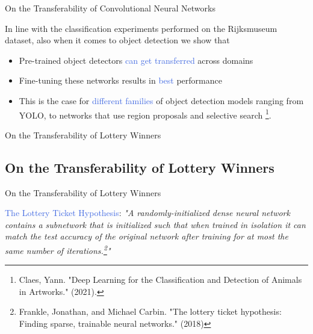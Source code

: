 \documentclass{beamer}
\begin{document}
\begin{frame}{On the Transferability of Convolutional Neural Networks}
	
	In line with the classification experiments performed on the Rijksmuseum dataset, also when it comes to object detection we show that
	\bigskip
	\begin{itemize}
		\item Pre-trained object detectors \textcolor{RoyalBlue}{can get transferred} across domains 
		\item Fine-tuning these networks results in \textcolor{RoyalBlue}{best} performance
		\item This is the case for \textcolor{RoyalBlue}{different families} of object detection models ranging from YOLO, to networks that use region proposals and selective search \footnote{Claes, Yann. "Deep Learning for the Classification and Detection of Animals in Artworks." (2021).}.
	\end{itemize}

\end{frame}



\begin{frame}{On the Transferability of Lottery Winners}
	\subsection{On the Transferability of Lottery Winners}
\end{frame}


\begin{frame}{On the Transferability of Lottery Winners}

	\begin{center}
		\textcolor{RoyalBlue}{The Lottery Ticket Hypothesis}:
		\textit{"A randomly-initialized dense neural network contains a subnetwork that is initialized such that when trained in isolation it can match the test accuracy of the original network after training for at most the same number of iterations.\footnote{Frankle, Jonathan, and Michael Carbin. "The lottery ticket hypothesis: Finding sparse, trainable neural networks." (2018)}"}
	\end{center}

\end{frame}
\end{document}

